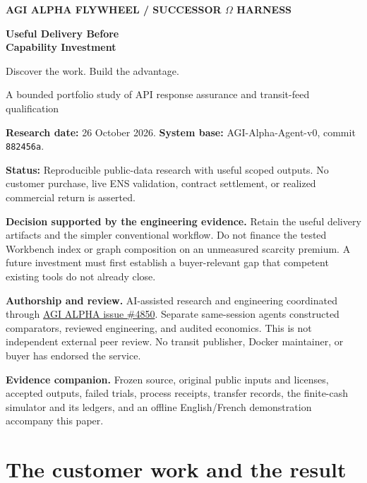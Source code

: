 \documentclass[11pt,letterpaper]{article}
\newcommand{\code}[1]{\texttt{\small #1}}
\begin{document}
\thispagestyle{empty}
{\small\bfseries\color{accent} AGI ALPHA FLYWHEEL \quad / \quad SUCCESSOR $\Omega$ HARNESS}
\vspace{0.8cm}

{\Huge\bfseries\color{ink} Useful Delivery Before\\[5pt] Capability Investment}

{\Large Discover the work. Build the advantage.}

{\large A bounded portfolio study of API response assurance and transit-feed qualification}

\vspace{0.4cm}
\textbf{Research date:} 26 October 2026. \quad
\textbf{System base:} AGI-Alpha-Agent-v0, commit \code{882456a}.

\textbf{Status:} Reproducible public-data research with useful scoped outputs. No customer purchase,
live ENS validation, contract settlement, or realized commercial return is asserted.



\vspace{0.3cm}
\colorbox{pale}{\parbox{\dimexpr\linewidth-2\fboxsep\relax}{
\textbf{Decision supported by the engineering evidence.}
Retain the useful delivery artifacts and the simpler conventional workflow. Do not finance the
tested Workbench index or graph composition on an unmeasured scarcity premium. A future investment
must first establish a buyer-relevant gap that competent existing tools do not already close.
}}

\vfill
\textbf{Authorship and review.} AI-assisted research and engineering coordinated through
\href{https://github.com/MontrealAI/AGI-Alpha-Agent-v0/issues/4850}{AGI ALPHA issue \#4850}.
Separate same-session agents constructed comparators, reviewed engineering, and audited economics.
This is not independent external peer review. No transit publisher, Docker maintainer, or buyer
has endorsed the service.

\textbf{Evidence companion.} Frozen source, original public inputs and licenses, accepted outputs,
failed trials, process receipts, transfer records, the finite-cash simulator and its ledgers,
and an offline English/French demonstration accompany this paper.
\newpage
\tableofcontents
\newpage

\section{The customer work and the result}
\end{document}
